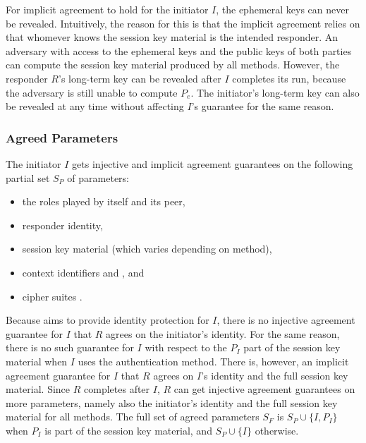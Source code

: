 For implicit agreement to hold for the initiator $I$, the ephemeral keys
can never be revealed.
%
Intuitively, the reason for this is that the implicit agreement relies on that
whomever knows the session key material is the intended responder.
%
An adversary with access to the ephemeral keys and the public keys of
both parties can compute the session key material produced by all methods.
%
However, the responder $R$'s long-term key can be revealed after $I$ completes
its run, because the adversary is still unable to compute $P_e$.
%
The initiator's long-term key can also be revealed at any time without affecting
$I$'s guarantee for the same reason.
%

\subsubsection{Agreed Parameters}
\label{sec:agreedParams}
The initiator $I$ gets injective and implicit agreement guarantees on the
following partial set $S_P$ of parameters:
\begin{itemize}
    \item the roles played by itself and its peer,
    \item responder identity,
    \item session key material (which varies depending on \mEdhoc{} method),
    \item context identifiers \mCi{} and \mCr{}, and
    \item cipher suites \mSuites{}.
\end{itemize}
%
Because \mEdhoc{} aims to provide identity protection for $I$, there is no
injective agreement guarantee for $I$ that $R$ agrees on the initiator's
identity.
%
For the same reason, there is no such guarantee for $I$ with respect to
the $P_I$ part of the session key material when $I$ uses the \mStat{}
authentication method.
%
There is, however, an implicit agreement guarantee for $I$ that $R$ agrees on
$I$'s identity and the full session key material.
%
Since $R$ completes after $I$, $R$ can get injective agreement guarantees on
more parameters, namely also the initiator's identity and the full session key
material for all methods.
%
The full set of agreed parameters $S_F$ is $S_P \cup \{I, P_I\}$
when $P_I$ is
part of the session key material, and $S_P \cup \{I\}$ otherwise.
%

